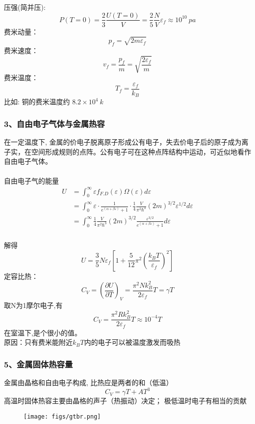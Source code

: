\begin{frame}[label=current]
  \frametitle{}
压强(简并压):
\[ P(T=0) =\frac{2}{3}  \frac{U(T=0)}{V} = \frac{2}{5}\frac{N}{V} \varepsilon _f \approx 10^{10}~pa\]
费米动量： 
\[ p_f = \sqrt{ 2m \varepsilon _f} \]
费米速度：
\[ v_f = \frac{p_f}{m} = \sqrt{ \frac{2 \varepsilon _f}{m}}\]
费米温度：
\[ T_f = \frac{\varepsilon_f}{k_B}  \]
比如: 铜的费米温度约 $8.2\times 10^4 ~k$
\end{frame} 

\begin{frame}[label=current]
  \frametitle{ 3、自由电子气体与金属热容}
  在一定温度下, 金属的价电子脱离原子形成公有电子，失去价电子后的原子成为离子实，在空间形成规则的点阵。公有电子可在这种点阵结构中运动，可近似地看作自由电子气体。\\
  ~~\\ 
  自由电子气的能量
  \[ 
  \begin{aligned}
  U &= \int_0^\infty \varepsilon f_{F.D}(\varepsilon) \Omega(\varepsilon) d \varepsilon \\ 
  &= \int_0^\infty \varepsilon \cdot \frac{1}{e^{(\alpha +\beta \varepsilon)}+1} \cdot \frac{1}{4} \frac{V}{\pi ^2 \hbar^3} (2m)^{3/2} \varepsilon^{1/2} d \varepsilon \\
  &= \int_0^\infty \frac{1}{4} \frac{V}{\pi ^2 \hbar^3} (2m)^{3/2} \frac{\varepsilon^{3/2} }{e^{(\alpha +\beta \varepsilon)}+1}  d \varepsilon 
  \end{aligned}\]
\end{frame} 

\begin{frame}[label=current]
  \frametitle{}
  解得
  \[  U=\frac{3}{5}N \varepsilon _f \left[1+\frac{5}{12}\pi ^2 \left( \frac{k_BT}{\varepsilon _f}\right)^2 \right]\]
  定容比热： 
  \[ C_V = \left(\frac{\partial U}{\partial T }\right)_V = \frac{\pi ^2N k_B^2}{2\varepsilon _f} T = \gamma T\]
  取N为1摩尔电子,有
  \[ C_V = \frac{\pi ^2 R k_B^2}{2\varepsilon _f} T \approx 10^{-4} T\]
  在室温下,是个很小的值。 \\
  原因：只有费米能附近$k_BT$内的电子可以被温度激发而吸热
\end{frame} 

\begin{frame}[label=current]
  \frametitle{ 5、金属固体热容量}
   金属由晶格和自由电子构成, 比热应是两者的和（低温）
   \[ C_V = \gamma T + AT^3 \]
   高温时固体热容主要由晶格的声子（热振动）决定； 极低温时电子有相当的贡献
   \begin{figure}[htbp]
    \centering
    \texttt{[image: figs/gtbr.png]}
   \end{figure}
\end{frame} 

